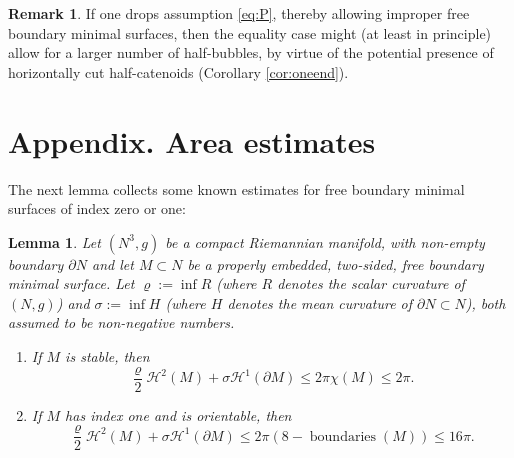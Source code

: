 \documentclass[JEP,XML,SOM,Unicode]{cedram}
\newcounter{cas}
\DeclareMathOperator{\boundaries}{boundaries}
\newtheorem{lem}[thm]{Lemma}
\theoremstyle{definition}
\newtheorem{rmk}[thm]{Remark}
\newcommand{\h}{\mathscr{H}}
\begin{document}
\begin{rmk}
If one drops assumption \eqref{eq:P}, thereby allowing improper free boundary minimal surfaces, then the equality case might (at least in principle) allow for a larger number of half-bubbles, by virtue of the potential presence of horizontally cut half-catenoids (\cf Corollary \ref{cor:oneend}).
\end{rmk}

\appendix

\section*{Appendix. Area estimates}\label{sec:area}

The next lemma collects some known estimates for free boundary minimal surfaces of index zero or one:

\begin{lem}\label{lem:stable}
Let $(N^3,g)$ be a compact Riemannian manifold, with non-empty boundary $\partial N$ and let $M\subset N$ be a properly embedded, two-sided, free boundary minimal surface. Let $\varrho:=\inf R$ (where $R$ denotes the scalar curvature of $(N,g)$) and $\sigma:=\inf H$ (where $H$ denotes the mean curvature of $\partial N\subset N$), both assumed to be non-negative numbers.
\begin{enumerate}
\item\label{lem:stable1}
If $M$ is stable, then
\[
\frac{\varrho}{2}\h^2(M)+\sigma\h^1(\partial M)\leq 2\pi\chi(M)\leq 2\pi.
\]
\item\label{lem:stable2}
If $M$ has index one and is orientable, then
\[
\frac{\varrho}{2}\h^2(M)+\sigma\h^1(\partial M)\leq 2\pi (8-\boundaries(M))\leq 16\pi.
\]
\end{enumerate}
\end{lem}
\end{document}

